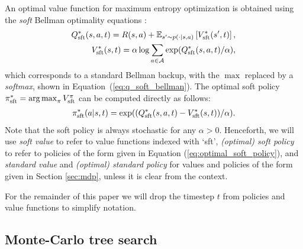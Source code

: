 \documentclass{article}
\newcommand{\bb}[1]{\mathbb{#1}}
\newcommand{\cl}[1]{\mathcal{#1}}
\newcommand{\Vss}[1]{V^*_{\textnormal{sft}}(#1)}
\newcommand{\Qss}[2]{Q^*_{\textnormal{sft}}(#1,#2)}
\newcommand{\pis}{\pi^*_{\textnormal{sft}}}
\DeclareMathOperator*{\argmax}{arg\,max}
\theoremstyle{plain}
\begin{document}
        An optimal value function for maximum entropy optimization is obtained using the \textit{soft} Bellman optimality equations \cite{haarnoja2018soft}:
        \begin{align}
            \Qss{s}{a,t} = R(s,a) 
            + \bb{E}_{s' \sim p(\cdot | s,a)} 
            \left[ \Vss{s',t} \right], \label{eq:v_soft_bellman} \\
            \Vss{s,t} = 
            \alpha \log \sum_{a\in\cl{A}} \exp(\Qss{s}{a,t}/\alpha), \label{eq:q_soft_bellman}
        \end{align}
        which corresponds to a standard Bellman backup, with the $\max$ replaced by a \textit{softmax}, shown in Equation~(\ref{eq:q_soft_bellman}). The optimal soft policy $\pis=\argmax_\pi V_{\text{sft}}^\pi$ can be computed directly \cite{nachum2017bridging} as follows:
        \begin{align}
            \pis(a|s,t) = \exp((\Qss{s}{a,t}-\Vss{s,t})/\alpha). \label{eq:optimal_soft_policy}
        \end{align}
         Note that the soft policy is always stochastic for any $\alpha > 0$. Henceforth, we will use \textit{soft value} to refer to value functions indexed with `sft', \textit{(optimal) soft policy} to refer to policies of the form given in Equation (\ref{eq:optimal_soft_policy}), and \textit{standard value} and \textit{(optimal) standard policy} for values and policies of the form given in Section \ref{sec:mdp}, unless it is clear from the context.
         
         For the remainder of this paper we will drop the timestep $t$ from policies and value functions to simplify notation.
    
    
    \subsection{Monte-Carlo tree search} \label{sec:mcts}

    
\end{document}
